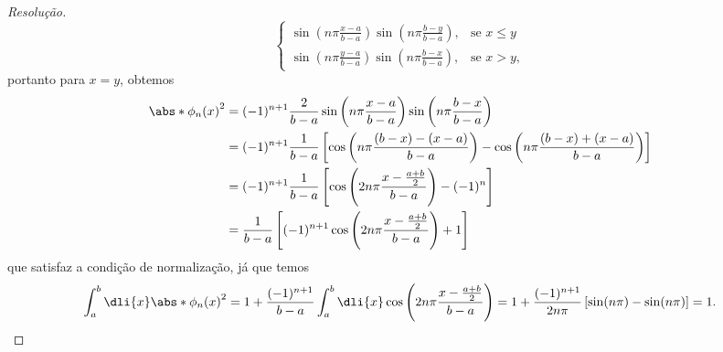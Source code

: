 \begin{proof}[Resolução]
\begin{equation*}
\begin{cases}
         \displaystyle \sin\left(n\pi \frac{x - a}{b-a}\right)\sin\left(n\pi \frac{b - y}{b-a}\right),&\text{se }x \leq y\\
         \displaystyle \sin\left(n\pi \frac{y - a}{b-a}\right)\sin\left(n\pi \frac{b - x}{b-a}\right),&\text{se }x > y,
      \end{cases}
   \end{equation*}
   portanto para \(x = y\), obtemos
   \begin{align*}
      \abs*{\phi_n(x)}^2 &= (-1)^{n+1} \frac{2}{b - a} \sin\left(n\pi \frac{x - a}{b-a}\right) \sin\left(n\pi \frac{b - x}{b-a}\right)\\
                         &= (-1)^{n+1} \frac{1}{b-a} \left[\cos\left(n\pi\frac{(b - x) - (x - a)}{b-a}\right) - \cos\left(n\pi\frac{(b - x) + (x - a)}{b - a}\right)\right]\\
                         &= (-1)^{n+1} \frac{1}{b - a}\left[\cos\left(2n\pi \frac{x - \frac{a + b}{2}}{b-a}\right)- (-1)^{n}\right]\\
                         &= \frac{1}{b - a} \left[(-1)^{n+1}\cos\left(2 n \pi \frac{x - \frac{a + b}{2}}{b - a}\right) + 1\right]
   \end{align*}
   que satisfaz a condição de normalização, já que temos
   \begin{equation*}
      \int_a^b \dli{x} \abs*{\phi_n(x)}^2 = 1 + \frac{(-1)^{n+1}}{b - a}\int_a^b\dli{x} \cos\left(2 n \pi \frac{x - \frac{a + b}{2}}{b - a}\right) = 1 + \frac{(-1)^{n+1}}{2 n \pi} \left[\sin(n \pi) - \sin(n \pi)\right] = 1.
   \end{equation*}
\end{proof}
